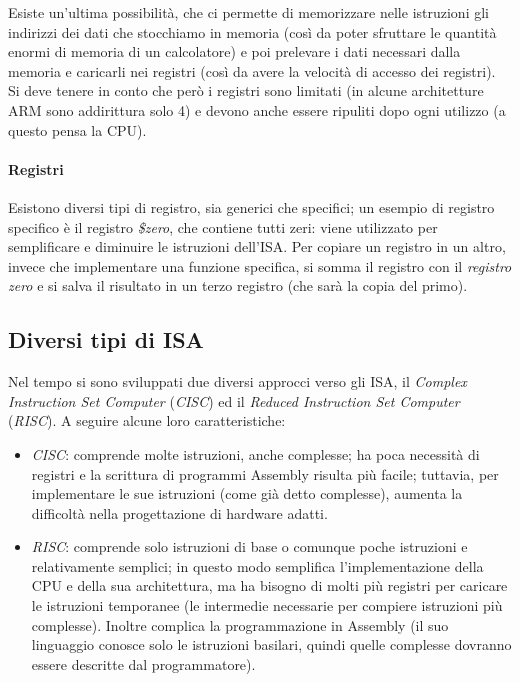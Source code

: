 \documentclass[class=book, crop=false, oneside]{standalone}
\begin{document}
Esiste un'ultima possibilità, che ci permette di memorizzare nelle istruzioni gli indirizzi dei dati che stocchiamo in memoria (così da poter sfruttare le quantità enormi di memoria di un calcolatore) e poi prelevare i dati necessari dalla memoria e caricarli nei registri (così da avere la velocità di accesso dei registri).\\
Si deve tenere in conto che però i registri sono limitati (in alcune architetture ARM sono addirittura solo 4) e devono anche essere ripuliti dopo ogni utilizzo (a questo pensa la CPU).

\paragraph*{Registri}
Esistono diversi tipi di registro, sia generici che specifici; un esempio di registro specifico è il registro \emph{\$zero}, che contiene tutti zeri: viene utilizzato per semplificare e diminuire le istruzioni dell’ISA. Per copiare un registro in un altro, invece che implementare una funzione specifica, si somma il registro con il \emph{registro zero} e si salva il risultato in un terzo registro (che sarà la copia del primo).

\subsection{Diversi tipi di ISA}
Nel tempo si sono sviluppati due diversi approcci verso  gli ISA, il \emph{Complex Instruction Set Computer} (\emph{CISC}) ed il \emph{Reduced Instruction Set Computer} (\emph{RISC}). A seguire alcune loro caratteristiche:
\begin{itemize}
	\item \emph{CISC}: comprende molte istruzioni, anche complesse; ha poca necessità di registri e la scrittura di programmi Assembly risulta più facile; tuttavia, per implementare le sue istruzioni (come già detto complesse), aumenta la difficoltà nella progettazione di hardware adatti.
	\item \emph{RISC}: comprende solo istruzioni di base o comunque poche istruzioni e relativamente semplici; in questo modo semplifica l’implementazione della CPU e della sua architettura, ma ha bisogno di molti più registri per caricare le istruzioni temporanee (le intermedie necessarie per compiere istruzioni più complesse). Inoltre complica la programmazione in Assembly (il suo linguaggio conosce solo le istruzioni basilari, quindi quelle complesse dovranno essere descritte dal programmatore).
\end{itemize}
\end{document}

